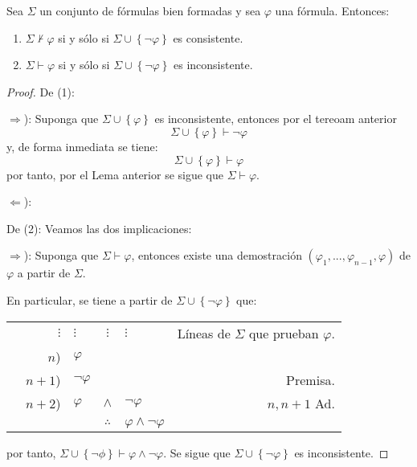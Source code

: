 \documentclass[12pt]{report}
\theoremstyle{largebreak}
\begin{document}
    \begin{cor}
        Sea $\Sigma$ un conjunto de fórmulas bien formadas y sea $\varphi$ una fórmula. Entonces:
        \begin{enumerate}
            \item $\Sigma\nvdash\varphi$ si y sólo si $\Sigma\cup\left\{\neg\varphi\right\}$ es consistente.
            \item $\Sigma\vdash\varphi$ si y sólo si $\Sigma\cup\left\{\neg\varphi\right\}$ es inconsistente.
        \end{enumerate}
    \end{cor}

    \begin{proof}
        De (1):

        $\Rightarrow$): Suponga que $\Sigma\cup\left\{\varphi \right\}$ es inconsistente, entonces por el tereoam anterior
        \begin{equation*}
            \Sigma\cup\left\{\varphi \right\}\vdash\neg\varphi
        \end{equation*}
        y, de forma inmediata se tiene:
        \begin{equation*}
            \Sigma\cup\left\{\varphi\right\}\vdash\varphi
        \end{equation*}
        por tanto, por el Lema anterior se sigue que $\Sigma\vdash\varphi$.

        $\Leftarrow$): %

        De (2): Veamos las dos implicaciones:

        $\Rightarrow$): Suponga que $\Sigma\vdash\varphi$, entonces existe una demostración $(\varphi_1,...,\varphi_{ n-1},\varphi)$ de $\varphi$ a partir de $\Sigma$.

        En particular, se tiene a partir de $\Sigma\cup\left\{\neg\varphi\right\}$ que:
        \begin{center}
            \begin{tabular}{l r l c l r}
                & $\vdots$ & $\vdots$ & $\vdots$ & $\vdots$ & Líneas de $\Sigma$ que prueban $\varphi$. \\
                & $n$) & $\varphi$ &  &  & \\
                & $n+1$) & $\neg\varphi$ &  &  & Premisa. \\
                & $n+2$) & $\varphi$ & $\land$ & $\neg\varphi$ & $n,n+1$ Ad. \\
                \hline
                & & & $\therefore$ & $\varphi\land\neg\varphi$ & \\
            \end{tabular}
        \end{center}
        por tanto, $\Sigma\cup\left\{\neg\phi\right\}\vdash\varphi\land\neg\varphi$. Se sigue que $\Sigma\cup\left\{\neg\varphi\right\}$ es inconsistente.


\end{proof}
\end{document}

